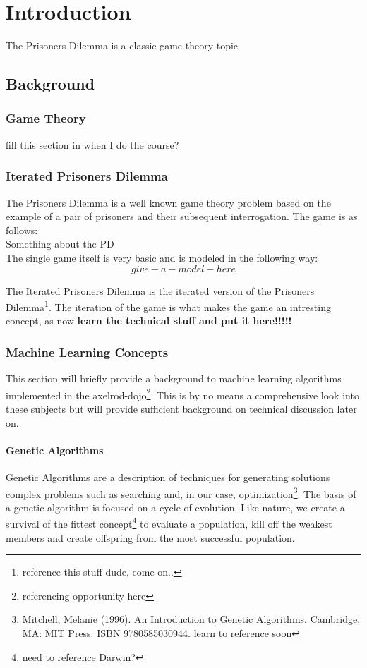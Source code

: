 
\chapter{Introduction}\label{ch:intro}

The Prisoners Dilemma is a classic game theory topic

    \section{Background}
        \subsection{Game Theory}
        fill this section in when I do the course?
        \subsection{Iterated Prisoners Dilemma}
        The Prisoners Dilemma is a well known game theory problem based on the example of a pair of prisoners and their subsequent interrogation. The game is as follows:\\ 

        Something about the PD \\ 

        The single game itself is very basic and is modeled in the following way: \\ 

        $$give-a-model-here$$

        The Iterated Prisoners Dilemma is the iterated version of the Prisoners Dilemma\footnote{reference this stuff dude, come on..}. The iteration of the game is what makes the game an intresting concept, as now \textbf{learn the technical stuff and put it here!!!!!}
        
        \subsection{Machine Learning Concepts}
        This section will briefly provide a background to machine learning algorithms implemented in the axelrod-dojo\footnote{referencing opportunity here}. This is by no means a comprehensive look into these subjects but will provide sufficient background on technical discussion later on.
            \subsubsection{Genetic Algorithms}
            Genetic Algorithms are a description of techniques for generating solutions complex problems such as searching and, in our case, optimization\footnote{Mitchell, Melanie (1996). An Introduction to Genetic Algorithms. Cambridge, MA: MIT Press. ISBN 9780585030944. learn to reference soon}. The basis of a genetic algorithm is focused on a cycle of evolution. Like nature, we create a survival of the fittest concept\footnote{need to reference Darwin?} to evaluate a population, kill off the weakest members and create offspring from the most successful population.\\
            
